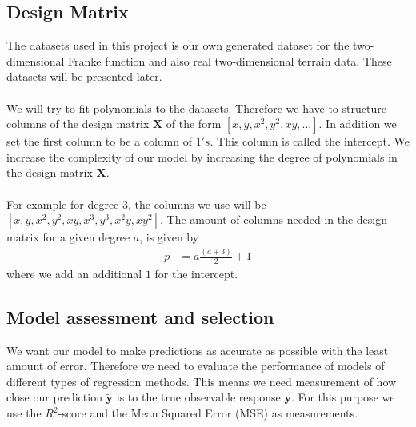 \documentclass[a4paper,twocolumn]{article}
\newcommand{\y}{\mathbf{y}}
\newcommand{\ytilde}{\mathbf{\widetilde{y}}}
\newcommand{\X}{\mathbf{X}}
\begin{document}
\subsection{Design Matrix}
The datasets used in this project is our own generated dataset for the two-dimensional Franke function and also real two-dimensional terrain data. These datasets will be presented later. \\
\\
We will try to fit polynomials to the datasets. Therefore we have to structure columns of the design matrix $\X$ of the form $[x, y, x^{2}, y^{2}, xy, ...]$. In addition we set the first column to be a column of $1's$. This column is called the intercept. We increase the complexity of our model by increasing the degree of polynomials in the design matrix $\X$.\\
\\
For example for degree 3, the columns we use will be $[x, y, x^{2}, y^{2}, xy, x^{3}, y^{3}, x^{2}y, xy^{2}]$. The amount of columns needed in the design matrix for a given degree $a$, is given by
\begin{align*}
    p &= a\frac{(a+3)}{2} + 1
\end{align*}
where we add an additional $1$ for the intercept.
\subsection{Model assessment and selection}
We want our model to make predictions as accurate as possible with the least amount of error. Therefore we need to evaluate the performance of models of different types of regression methods. This means we need measurement of how close our prediction $\ytilde$ is to the true observable response $\y$. For this purpose we use the $R^{2}$-score and the Mean Squared Error (MSE) as measurements.
\end{document}
